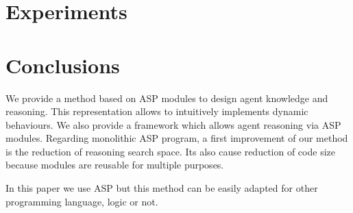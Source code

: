 \documentclass{aamas2012}
\begin{document}
\section{Experiments}

	
	

\section{Conclusions}

	We provide a method based on ASP modules to design agent knowledge and reasoning.
	This representation allows to intuitively implements dynamic behaviours.
	We also provide a framework which allows agent reasoning via ASP modules.
	Regarding monolithic ASP program, a first improvement of our method is the reduction of reasoning search space.
	Its also cause reduction of code size because modules are reusable for multiple purposes.
	
	In this paper we use ASP but this method can be easily adapted for other programming language, logic or not.
	
%

%
%

\nocite{*}
\end{document}
